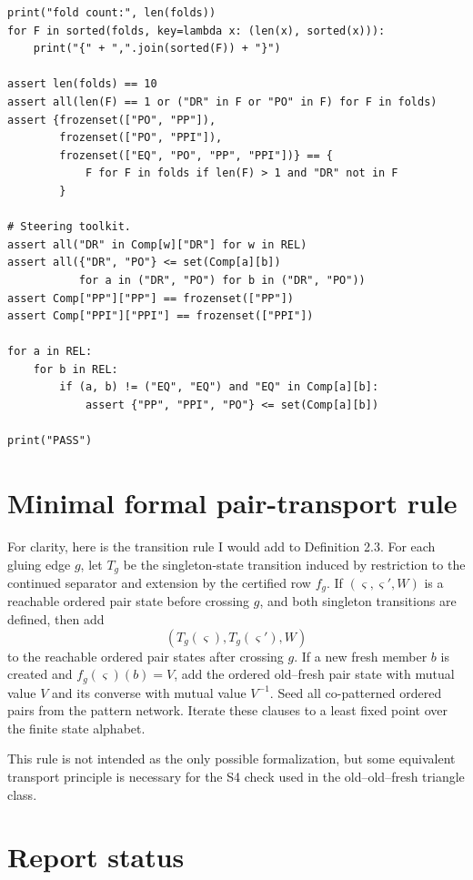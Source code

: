 \documentclass[11pt]{article}
\begin{document}
\begin{lstlisting}[style=reviewpython]
print("fold count:", len(folds))
for F in sorted(folds, key=lambda x: (len(x), sorted(x))):
    print("{" + ",".join(sorted(F)) + "}")

assert len(folds) == 10
assert all(len(F) == 1 or ("DR" in F or "PO" in F) for F in folds)
assert {frozenset(["PO", "PP"]),
        frozenset(["PO", "PPI"]),
        frozenset(["EQ", "PO", "PP", "PPI"])} == {
            F for F in folds if len(F) > 1 and "DR" not in F
        }

# Steering toolkit.
assert all("DR" in Comp[w]["DR"] for w in REL)
assert all({"DR", "PO"} <= set(Comp[a][b])
           for a in ("DR", "PO") for b in ("DR", "PO"))
assert Comp["PP"]["PP"] == frozenset(["PP"])
assert Comp["PPI"]["PPI"] == frozenset(["PPI"])

for a in REL:
    for b in REL:
        if (a, b) != ("EQ", "EQ") and "EQ" in Comp[a][b]:
            assert {"PP", "PPI", "PO"} <= set(Comp[a][b])

print("PASS")
\end{lstlisting}

\section{Minimal formal pair-transport rule}

For clarity, here is the transition rule I would add to Definition 2.3.  For each gluing edge \(g\), let \(T_g\) be the singleton-state transition induced by restriction to the continued separator and extension by the certified row \(f_g\).  If \((\varsigma,\varsigma',W)\) is a reachable ordered pair state before crossing \(g\), and both singleton transitions are defined, then add
\[
  (T_g(\varsigma),T_g(\varsigma'),W)
\]
to the reachable ordered pair states after crossing \(g\).  If a new fresh member \(b\) is created and \(f_g(\varsigma)(b)=V\), add the ordered old--fresh pair state with mutual value \(V\) and its converse with mutual value \(V^{-1}\).  Seed all co-patterned ordered pairs from the pattern network.  Iterate these clauses to a least fixed point over the finite state alphabet.

This rule is not intended as the only possible formalization, but some equivalent transport principle is necessary for the S4 check used in the old--old--fresh triangle class.

\section{Report status}
\end{document}
